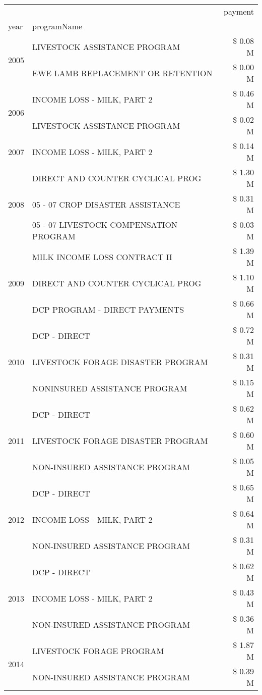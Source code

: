 \begin{tabular}{llr}
\toprule
 &  & payment \\
year & programName &  \\
\midrule
\multirow[t]{2}{*}{2005} & LIVESTOCK ASSISTANCE PROGRAM & \$ 0.08 M \\
 & EWE LAMB REPLACEMENT OR RETENTION & \$ 0.00 M \\
\cline{1-3}
\multirow[t]{2}{*}{2006} & INCOME LOSS - MILK, PART 2 & \$ 0.46 M \\
 & LIVESTOCK ASSISTANCE PROGRAM & \$ 0.02 M \\
\cline{1-3}
2007 & INCOME LOSS - MILK, PART 2 & \$ 0.14 M \\
\cline{1-3}
\multirow[t]{3}{*}{2008} & DIRECT AND COUNTER CYCLICAL PROG & \$ 1.30 M \\
 & 05 - 07 CROP DISASTER ASSISTANCE & \$ 0.31 M \\
 & 05 - 07 LIVESTOCK COMPENSATION PROGRAM & \$ 0.03 M \\
\cline{1-3}
\multirow[t]{3}{*}{2009} & MILK INCOME LOSS CONTRACT II & \$ 1.39 M \\
 & DIRECT AND COUNTER CYCLICAL PROG & \$ 1.10 M \\
 & DCP PROGRAM - DIRECT PAYMENTS & \$ 0.66 M \\
\cline{1-3}
\multirow[t]{3}{*}{2010} & DCP - DIRECT & \$ 0.72 M \\
 & LIVESTOCK FORAGE DISASTER PROGRAM & \$ 0.31 M \\
 & NONINSURED ASSISTANCE PROGRAM & \$ 0.15 M \\
\cline{1-3}
\multirow[t]{3}{*}{2011} & DCP - DIRECT & \$ 0.62 M \\
 & LIVESTOCK FORAGE DISASTER PROGRAM & \$ 0.60 M \\
 & NON-INSURED ASSISTANCE PROGRAM & \$ 0.05 M \\
\cline{1-3}
\multirow[t]{3}{*}{2012} & DCP - DIRECT & \$ 0.65 M \\
 & INCOME LOSS - MILK, PART 2 & \$ 0.64 M \\
 & NON-INSURED ASSISTANCE PROGRAM & \$ 0.31 M \\
\cline{1-3}
\multirow[t]{3}{*}{2013} & DCP - DIRECT & \$ 0.62 M \\
 & INCOME LOSS - MILK, PART 2 & \$ 0.43 M \\
 & NON-INSURED ASSISTANCE PROGRAM & \$ 0.36 M \\
\cline{1-3}
\multirow[t]{3}{*}{2014} & LIVESTOCK FORAGE PROGRAM & \$ 1.87 M \\
 & NON-INSURED ASSISTANCE PROGRAM & \$ 0.39 M \\

\end{tabular}
